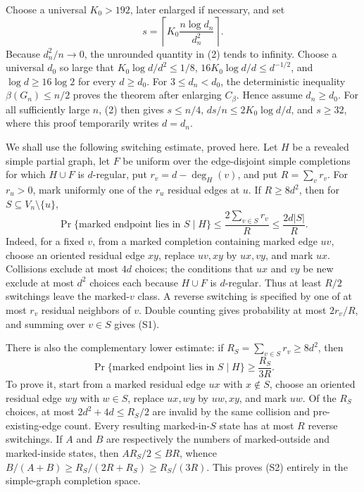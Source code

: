 Choose a universal \(K_0>192\), later enlarged if necessary, and set
\[
s=\left\lceil K_0\frac{n\log d_n}{d_n^2}\right\rceil.
\tag{2}
\]
Because \(d_n^2/n\to0\), the unrounded quantity in (2) tends to infinity.  Choose a universal \(d_0\) so large that \(K_0\log d/d^2\le1/8\), \(16K_0\log d/d\le d^{-1/2}\), and \(\log d\ge16\log2\) for every \(d\ge d_0\).  For \(3\le d_n<d_0\), the deterministic inequality \(\beta(G_n)\le n/2\) proves the theorem after enlarging \(C_\beta\).  Hence assume \(d_n\ge d_0\).  For all sufficiently large \(n\), (2) then gives \(s\le n/4\), \(ds/n\le2K_0\log d/d\), and \(s\ge32\), where this proof temporarily writes \(d=d_n\).

We shall use the following switching estimate, proved here.  Let \(H\) be a revealed simple partial graph, let \(F\) be uniform over the edge-disjoint simple completions for which \(H\cup F\) is \(d\)-regular, put \(r_v=d-\deg_H(v)\), and put \(R=\sum_vr_v\).  For \(r_u>0\), mark uniformly one of the \(r_u\) residual edges at \(u\).  If \(R\ge8d^2\), then for \(S\subseteq V_n\setminus\{u\}\),
\[
\Pr\{\text{marked endpoint lies in }S\mid H\}\le\frac{2\sum_{v\in S}r_v}{R}\le\frac{2d|S|}{R}.
\tag{S1}
\]
Indeed, for a fixed \(v\), from a marked completion containing marked edge \(uv\), choose an oriented residual edge \(xy\), replace \(uv,xy\) by \(ux,vy\), and mark \(ux\).  Collisions exclude at most \(4d\) choices; the conditions that \(ux\) and \(vy\) be new exclude at most \(d^2\) choices each because \(H\cup F\) is \(d\)-regular.  Thus at least \(R/2\) switchings leave the marked-\(v\) class.  A reverse switching is specified by one of at most \(r_v\) residual neighbors of \(v\).  Double counting gives probability at most \(2r_v/R\), and summing over \(v\in S\) gives (S1).

There is also the complementary lower estimate: if \(R_S=\sum_{v\in S}r_v\ge8d^2\), then
\[
\Pr\{\text{marked endpoint lies in }S\mid H\}\ge\frac{R_S}{3R}.
\tag{S2}
\]
To prove it, start from a marked residual edge \(ux\) with \(x\notin S\), choose an oriented residual edge \(wy\) with \(w\in S\), replace \(ux,wy\) by \(uw,xy\), and mark \(uw\).  Of the \(R_S\) choices, at most \(2d^2+4d\le R_S/2\) are invalid by the same collision and pre-existing-edge count.  Every resulting marked-in-\(S\) state has at most \(R\) reverse switchings.  If \(A\) and \(B\) are respectively the numbers of marked-outside and marked-inside states, then \(AR_S/2\le BR\), whence \(B/(A+B)\ge R_S/(2R+R_S)\ge R_S/(3R)\).  This proves (S2) entirely in the simple-graph completion space.

